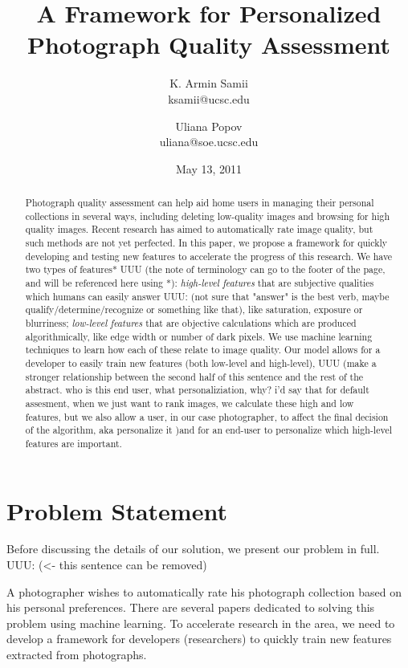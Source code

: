 \documentclass[11pt,letter]{article}
\title{A Framework for Personalized Photograph Quality Assessment}
\author{
K. Armin Samii \\
ksamii@ucsc.edu
\and
Uliana Popov \\
uliana@soe.ucsc.edu}
\date{May 13, 2011}
\begin{document}
\maketitle
\begin{abstract}
Photograph quality assessment can help aid home users in managing their personal collections in several ways, including deleting low-quality images and browsing for high quality images. Recent research has aimed to automatically rate image quality, but such methods are not yet perfected. In this paper, we propose a framework for quickly developing and testing new features to accelerate the progress of this research. We have two types of features* UUU (the note of terminology can go to the footer of the page, and will be referenced here using *): \textit{high-level features} that are subjective qualities which humans can easily answer UUU: (not sure that "answer" is the best verb, maybe qualify/determine/recognize or something like that), like saturation, exposure or blurriness; \textit{low-level features} that are objective calculations which are produced algorithmically, like edge width or number of dark pixels. We use machine learning techniques to learn how each of these relate to image quality. Our model allows for a developer to easily train new features (both low-level and high-level), UUU (make a stronger relationship between the second half of this sentence and the rest of the abstract. who is this end user, what personaliziation, why? i'd say that for default assesment, when we just want to rank images, we calculate these high and low features, but we also allow a user, in our case photographer, to affect the final decision of the algorithm, aka personalize it )and for an end-user to personalize which high-level features are important.

\end{abstract}

\section{Problem Statement}
Before discussing the details of our solution, we present our problem in full. UUU: (<- this sentence can be removed)

A photographer wishes to automatically rate his photograph collection based on his personal preferences. There are several papers dedicated to solving this problem using machine learning\cite{springerlink:10.1007/11744078_23}\cite{springerlink:10.1007/978-3-642-10543-2_23}\cite{Yeh:2010:PPR:1873951.1873963}. To accelerate research in the area, we need to develop a framework for developers (researchers) to quickly train new features extracted from photographs.
\end{document}

